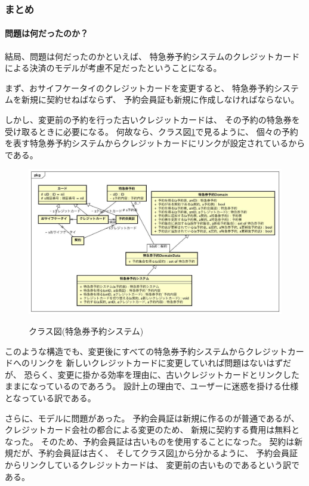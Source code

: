 \subsubsection{まとめ}
\paragraph{問題は何だったのか？}
結局、問題は何だったのかといえば、
特急券予約システムのクレジットカードによる決済のモデルが考慮不足だったということになる。

まず、おサイフケータイのクレジットカードを変更すると、
特急券予約システムを新規に契約せねばならず、
予約会員証も新規に作成しなければならない。

しかし、変更前の予約を行った古いクレジットカードは、
その予約の特急券を受け取るときに必要になる。
何故なら、クラス図\ref{fig:ExpressReservationClassDiagram}で見るように、
個々の予約を表す特急券予約システムからクレジットカードにリンクが設定されているからである。

\begin{figure}[h]
	\centering
	{\includegraphics[width=55zw, keepaspectratio]{./image/ClassDiagram.jpg}}
	\caption{クラス図(特急券予約システム)}
	\label{fig:ExpressReservationClassDiagram}
\end{figure}

このような構造でも、変更後にすべての特急券予約システムからクレジットカードへのリンクを
新しいクレジットカードに変更していれば問題はないはずだが、
恐らく、変更に掛かる効率を理由に、古いクレジットカードとリンクしたままになっているのであろう。
設計上の理由で、ユーザーに迷惑を掛ける仕様となっている訳である。

さらに、モデルに問題があった。
予約会員証は新規に作るのが普通であるが、
クレジットカード会社の都合による変更のため、
新規に契約する費用は無料となった。
そのため、予約会員証は古いものを使用することになった。
契約は新規だが、予約会員証は古く、
そしてクラス図\ref{fig:ExpressReservationClassDiagram}から分かるように、
予約会員証からリンクしているクレジットカードは、
変更前の古いものであるという訳である。

